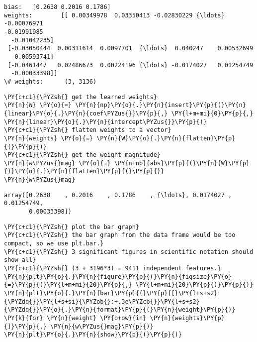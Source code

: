     \begin{Verbatim}[commandchars=\\\{\}]
bias:   [0.2638 0.2016 0.1786]
weights:        [[ 0.00349978  0.03350413 -0.02830229 {\ldots} -0.00076971
-0.01991985
  -0.01042235]
 [-0.03050444  0.00311614  0.0097701  {\ldots}  0.040247    0.00532699
  -0.00593741]
 [-0.0461447   0.02486673  0.00224196 {\ldots} -0.0174027   0.01254749
  -0.00033398]]
\# weights:      (3, 3136)
    \end{Verbatim}

    \begin{tcolorbox}[breakable, size=fbox, boxrule=1pt, pad at break*=1mm,colback=cellbackground, colframe=cellborder]
\begin{Verbatim}[commandchars=\\\{\}]
\PY{c+c1}{\PYZsh{} get the learned weights}
\PY{n}{W} \PY{o}{=} \PY{n}{np}\PY{o}{.}\PY{n}{insert}\PY{p}{(}\PY{n}{linear}\PY{o}{.}\PY{n}{coef\PYZus{}}\PY{p}{,} \PY{l+m+mi}{0}\PY{p}{,} \PY{n}{linear}\PY{o}{.}\PY{n}{intercept\PYZus{}}\PY{p}{)}
\PY{c+c1}{\PYZsh{} flatten weights to a vector}
\PY{n}{weights} \PY{o}{=} \PY{n}{W}\PY{o}{.}\PY{n}{flatten}\PY{p}{(}\PY{p}{)}
\PY{c+c1}{\PYZsh{} get the weight magnitude}
\PY{n}{w\PYZus{}mag} \PY{o}{=} \PY{n+nb}{abs}\PY{p}{(}\PY{n}{W}\PY{p}{)}\PY{o}{.}\PY{n}{flatten}\PY{p}{(}\PY{p}{)}
\PY{n}{w\PYZus{}mag}
\end{Verbatim}
\end{tcolorbox}

            \begin{tcolorbox}[breakable, size=fbox, boxrule=.5pt, pad at break*=1mm, opacityfill=0]
\begin{Verbatim}[commandchars=\\\{\}]
array([0.2638    , 0.2016    , 0.1786    , {\ldots}, 0.0174027 , 0.01254749,
       0.00033398])
\end{Verbatim}
\end{tcolorbox}
        
    \begin{tcolorbox}[breakable, size=fbox, boxrule=1pt, pad at break*=1mm,colback=cellbackground, colframe=cellborder]
\begin{Verbatim}[commandchars=\\\{\}]
\PY{c+c1}{\PYZsh{} plot the bar graph}
\PY{c+c1}{\PYZsh{} the bar graph from the data frame would be too compact, so we use plt.bar.}
\PY{c+c1}{\PYZsh{} 3 significant figures in scientific notation should show all}
\PY{c+c1}{\PYZsh{} (3 + 3196*3) = 9411 independent features.}
\PY{n}{plt}\PY{o}{.}\PY{n}{figure}\PY{p}{(}\PY{n}{figsize}\PY{o}{=}\PY{p}{(}\PY{l+m+mi}{20}\PY{p}{,} \PY{l+m+mi}{20}\PY{p}{)}\PY{p}{)}
\PY{n}{plt}\PY{o}{.}\PY{n}{bar}\PY{p}{(}\PY{p}{[}\PY{l+s+s2}{\PYZdq{}}\PY{l+s+si}{\PYZob{}:+.3e\PYZcb{}}\PY{l+s+s2}{\PYZdq{}}\PY{o}{.}\PY{n}{format}\PY{p}{(}\PY{n}{weight}\PY{p}{)} \PY{k}{for} \PY{n}{weight} \PY{o+ow}{in} \PY{n}{weights}\PY{p}{]}\PY{p}{,} \PY{n}{w\PYZus{}mag}\PY{p}{)}
\PY{n}{plt}\PY{o}{.}\PY{n}{show}\PY{p}{(}\PY{p}{)}
\end{Verbatim}
\end{tcolorbox}


